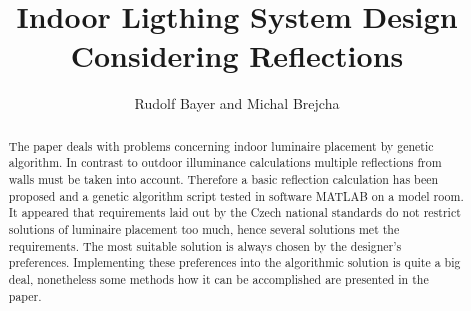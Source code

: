 \documentclass[Afour,sagev,times,doublespace]{sagej}
\begin{document}

\title{Indoor Ligthing System Design Considering Reflections}

\author{Rudolf Bayer and Michal Brejcha}




\begin{abstract}
The paper deals with problems concerning indoor luminaire placement by genetic algorithm. In contrast to outdoor illuminance calculations multiple reflections from walls must be taken into account. Therefore a basic reflection calculation has been proposed and a genetic algorithm script tested in software MATLAB on a model room. It appeared that requirements laid out by the Czech national standards do not restrict solutions of luminaire placement too much, hence several solutions met the requirements. The most suitable solution is always chosen by the designer's preferences. Implementing these preferences into the algorithmic solution is quite a big deal, nonetheless some methods how it can be accomplished are presented in the paper.
\end{abstract}


\maketitle










\newpage
\end{document}
